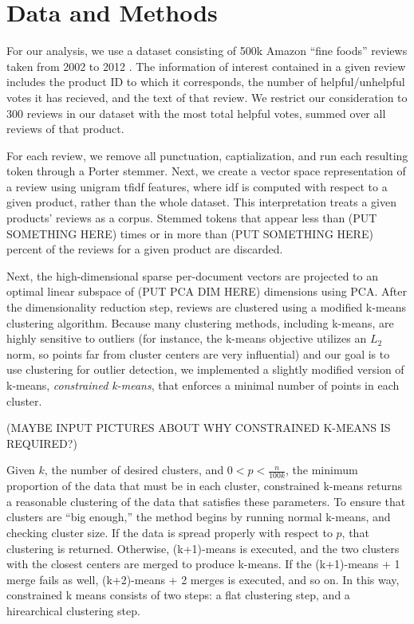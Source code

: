 \documentclass[10pt]{article}
\begin{document}
\section*{Data and Methods}
For our analysis, we use a dataset consisting of 500k Amazon ``fine foods'' reviews taken from 2002 to 2012 \cite{mcauley2013amateurs}. The information of interest contained in a given review includes the product ID to which it corresponds, the number of helpful/unhelpful votes it has recieved, and the text of that review. We restrict our consideration to 300 reviews in our dataset with the most total helpful votes, summed over all reviews of that product.

For each review, we remove all punctuation, captialization, and run each resulting token through a Porter stemmer. Next, we create a vector space representation of a review using unigram tfidf features, where idf is computed with respect to a given product, rather than the whole dataset. This interpretation treats a given products' reviews as a corpus. Stemmed tokens that appear less than (PUT SOMETHING HERE) times or in more than (PUT SOMETHING HERE) percent of the reviews for a given product are discarded.

Next, the high-dimensional sparse per-document vectors are projected to an optimal linear subspace of (PUT PCA DIM HERE) dimensions using PCA. After the dimensionality reduction step, reviews are clustered using a modified k-means clustering algorithm. Because many clustering methods, including k-means, are highly sensitive to outliers (for instance, the k-means objective utilizes an $L_2$ norm, so points far from cluster centers are very influential) and our goal is to use clustering for outlier detection, we implemented a slightly modified version of k-means, \emph{constrained k-means}, that enforces a minimal number of points in each cluster.

(MAYBE INPUT PICTURES ABOUT WHY CONSTRAINED K-MEANS IS REQUIRED?)

Given $k$, the number of desired clusters, and $0 < p < \frac{n}{100k}$, the minimum proportion of the data that must be in each cluster, constrained k-means returns a reasonable clustering of the data that satisfies these parameters. To ensure that clusters are ``big enough,'' the method begins by running normal k-means, and checking cluster size. If the data is spread properly with respect to $p$, that clustering is returned. Otherwise, (k+1)-means is executed, and the two clusters with the closest centers are merged to produce k-means. If the (k+1)-means + 1 merge fails as well, (k+2)-means + 2 merges is executed, and so on. In this way, constrained k means consists of two steps: a flat clustering step, and a hirearchical clustering step.
\end{document}
